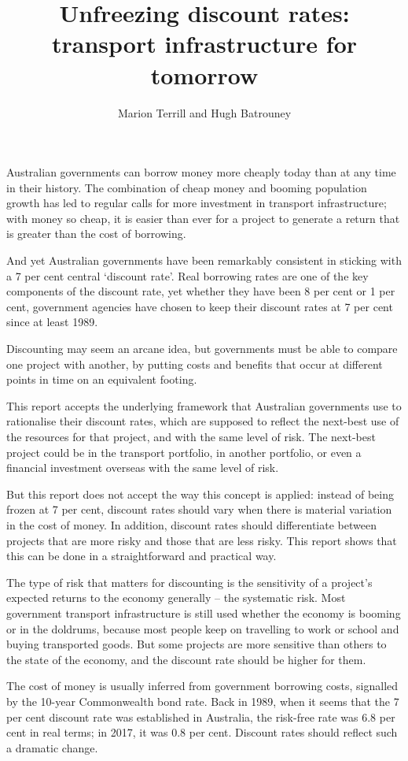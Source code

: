 \documentclass{grattan}
\title{Unfreezing discount rates: transport infrastructure for tomorrow}
\author{Marion Terrill and Hugh Batrouney}
\begin{document}
\begin{overview}

Australian governments can borrow money more cheaply today than at any time in their history. The combination of cheap money and booming population growth has led to regular calls for more investment in transport infrastructure; with money so cheap, it is easier than ever for a project to generate a return that is greater than the cost of borrowing.
 
And yet Australian governments have been remarkably consistent in sticking with a 7 per cent central `discount rate'. Real borrowing rates are one of the key components of the discount rate, yet whether they have been 8 per cent or 1 per cent, government agencies have chosen to keep their discount rates at 7 per cent since at least 1989.

Discounting may seem an arcane idea, but governments must be able to compare one project with another, by putting costs and benefits that occur at different points in time on an equivalent footing.
 
This report accepts the underlying framework that Australian governments use to rationalise their discount rates, which are supposed to reflect the next-best use of the resources for that project, and with the same level of risk. The next-best project could be in the transport portfolio, in another portfolio, or even a financial investment overseas with the same level of risk.
 
But this report does not accept the way this concept is applied: instead of being frozen at 7 per cent, discount rates should vary when there is material variation in the cost of money. In addition, discount rates should differentiate between projects that are more risky and those that are less risky. This report shows that this can be done in a straightforward and practical way.
 
The type of risk that matters for discounting is the sensitivity of a project’s expected returns to the economy generally -- the systematic risk. Most government transport infrastructure is still used whether the economy is booming or in the doldrums, because most people keep on travelling to work or school and buying transported goods. But some projects are more sensitive than others to the state of the economy, and the discount rate should be higher for them.
 
The cost of money is usually inferred from government borrowing costs, signalled by the 10-year Commonwealth bond rate. Back in 1989, when it seems that the 7 per cent discount rate was established in Australia, the risk-free rate was 6.8 per cent in real terms; in 2017, it was 0.8 per cent. Discount rates should reflect such a dramatic change.
 

\end{overview}
\end{document}
